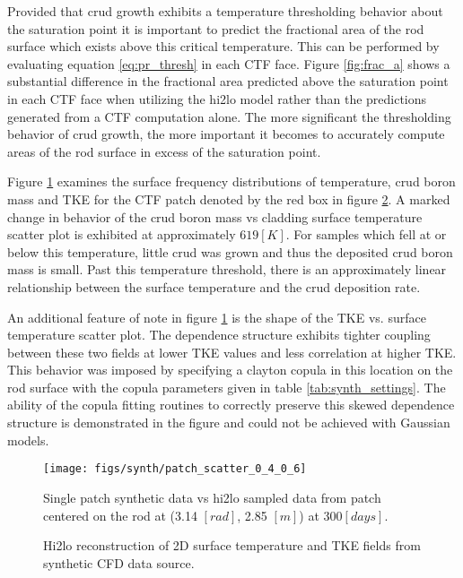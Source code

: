 Provided that crud growth exhibits a temperature thresholding behavior about the saturation point it is important to predict the fractional area of the rod surface which exists above this critical temperature.  This can be performed by evaluating equation \ref{eq:pr_thresh} in each CTF face. Figure \ref{fig:frac_a} shows a substantial difference in the fractional area predicted above the saturation point in each CTF face when utilizing the hi2lo model rather than the predictions generated from a CTF computation alone.  The more significant the thresholding behavior of crud growth, the more important it becomes to accurately compute areas of the rod surface in excess of the saturation point.

Figure \ref{fig:patchscatter} examines the surface frequency distributions of temperature, crud boron mass and TKE for the CTF patch denoted by the red box in figure \ref{fig:hi2lo_tke_t}.  A marked change in behavior of the crud boron mass vs cladding surface temperature scatter plot is exhibited at approximately $ 619[K]$.  For samples which fell at or below this temperature, little crud was grown and thus the deposited crud boron mass is small.  Past this temperature threshold, there is an approximately linear relationship between the surface temperature and the crud deposition rate.  

An additional feature of note in figure  \ref{fig:patchscatter} is the shape of the TKE vs. surface temperature scatter plot.  The dependence structure exhibits tighter coupling between these two fields at lower TKE values and less correlation at higher TKE.  This behavior was imposed by specifying a clayton copula in this location on the rod surface with the copula parameters given in table \ref{tab:synth_settings}.  The ability of the copula fitting routines to correctly preserve this skewed dependence structure is demonstrated in the figure and could not be achieved with Gaussian models.

\begin{figure}[H]
    \centering
    \texttt{[image: figs/synth/patch\_scatter\_0\_4\_0\_6]}
    \caption[Single patch synthetic CFD data vs hi2lo sampled data.]{Single patch synthetic data vs hi2lo sampled data from patch centered on the rod at (3.14 $[rad]$, 2.85 $[m]$) at 300$[days]$.}
    \label{fig:patchscatter}
\end{figure}

\begin{figure}[H]%
    \captionsetup[subfigure]{justification=centering}
    \centering
    \hspace*{-3.1em}%
    \caption{Hi2lo reconstruction of 2D surface temperature and TKE fields from synthetic CFD data source. }%
    \label{fig:hi2lo_tke_t}%
\end{figure}


